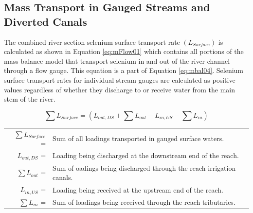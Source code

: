 \begin{linenumbers}

\clearpage{}
\section{Mass Transport in Gauged Streams and Diverted Canals}
\label{sec:MassTransport}


The combined river section selenium surface transport rate $(L_{Surface})$ is calculated as shown in Equation \ref{eq:mFlow01} which contains all portions of the mass balance model that transport selenium in and out of the river channel through a flow gauge.  This equation is a part of Equation \ref{eq:mbal04}.  Selenium surface transport rates for individual stream gauges are calculated as positive values regardless of whether they discharge to or receive water from the main stem of the river. 

\begin{equation}
	\sum L_{Surface} = \left( L_{out,DS} + \sum L_{out} - L_{in,US} - \sum L_{in} \right)
\label{eq:mFlow01}
\end{equation}
\begin{tabular}{r p{5.25in}}
	$ \sum L_{Surface} $ = & Sum of all loadings transported in gauged surface waters.\\
	$ L_{out,DS} $ = & Loading being discharged at the downstream end of the reach. \\
	$ \sum L_{out} $ = & Sum of oadings being discharged through the reach irrigation canals.\\
	$ L_{in,US} $ = & Loading being received at the upstream end of the reach. \\
	$ \sum L_{in} $ = & Sum of loadings being received through the reach tributaries.\\
\end{tabular}\\


\end{linenumbers}
